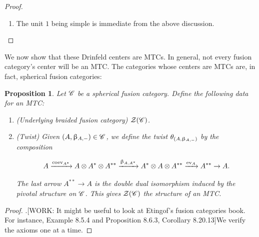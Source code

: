 \documentclass{article}
\newtheorem{proposition}{Proposition}[section]
\theoremstyle{definition}
\numberwithin{figure}{section}
\begin{document}
\begin{enumerate}[\thesection .1.]
\begin{proof}
\begin{enumerate}
If two half-braidings are equal on simple elements, then semisimplicity implies they are equal everywhere. Hence, the lemma tells us that the isomorphism classes of simple objects of $\Zcal(\Ccat)$ are a linearly independent subset of

$$\bigoplus_{a,b\in \LL}\Hom(A\otimes B,B\otimes A),$$

where $\LL$ is the set of isomorphism classes of simple objects of $\Ccat$, and $A$ (resp. $B$) is a representative of $a$ (resp. $b$). Thus, we find that the number of isomorphism classes of simple objects in $\Zcal(\Ccat)$ is bounded above by the finite quantity

$$\sum_{a,b\in \LL}\dim \Hom(a\otimes b,b\otimes a),$$

finishing the proof. Note that this equality can be tight (such as in the case of the toric code).

\item The unit $1$ being simple is immediate from the above discussion.
\end{enumerate}

\end{proof}

We now show that these Drinfeld centers are MTCs. In general, not every fusion category's center will be an MTC. The categories whose centers are MTCs are, in fact, spherical fusion categories:

\begin{proposition}\label{spherical-center-modular} Let $\Ccat$ be a spherical fusion category. Define the following data for an MTC:

\begin{enumerate}
\item (Underlying braided fusion category) $\Zcal(\Ccat)$.
\item (Twist) Given $(A,\upbeta_{A,\--})\in \mathscr{C}$, we define the twist $\theta_{(A,\upbeta_{A,\--})}$ by the composition

$$A\xrightarrow{\mathrm{coev}_{A^*}} A\otimes A^*\otimes A^{**}\xrightarrow{\upbeta_{A,A^*}} A^*\otimes A \otimes A^{**}\xrightarrow{\mathrm{ev}_{A}} A^{**}\to A.$$

The last arrow $A^{**}\to A$ is the double dual isomorphism induced by the pivotal structure on $\Ccat$. This gives $\Zcal(\Ccat)$ the structure of an MTC.
\end{enumerate}

\end{proposition}
\begin{proof} .[WORK: It might be useful to look at Etingof's fusion categories book. For instance, Example 8.5.4 and Proposition 8.6.3, Corollary 8.20.13]We verify the axioms one at a time.


\end{proof}
\end{enumerate}
\end{document}
